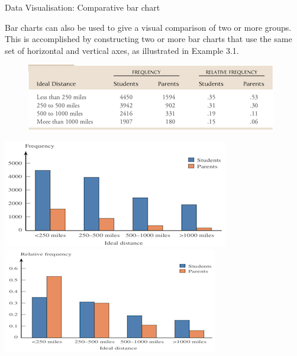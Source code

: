 \documentclass[ignorenonframetext,]{beamer}
\begin{document}
\begin{frame}{Data Visualisation: Comparative bar chart}

Bar charts can also be used to give a visual comparison of two or more
groups. This is accomplished by constructing two or more bar charts that
use the same set of horizontal and vertical axes, as illustrated in
Example 3.1.

\begin{figure}
\centering
\includegraphics{fig1.3.png}
\caption{}
\end{figure}

\includegraphics{fig1.4.png}\includegraphics{fig1.5.png}

\end{frame}
\end{document}
